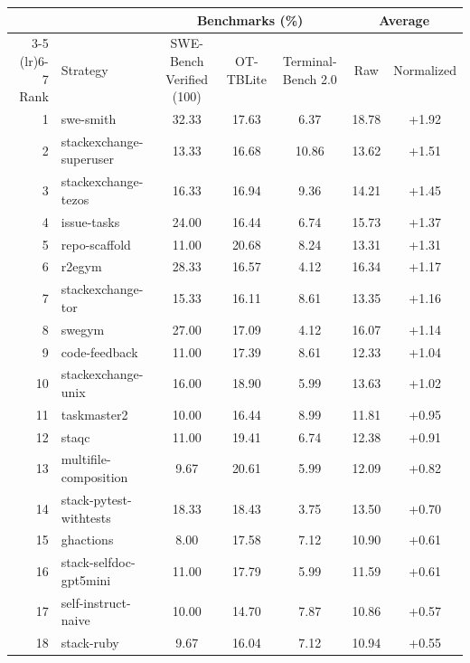 \documentclass{llmxive}
\begin{document}
\begin{table}[!htbp]
\centering
\footnotesize
\setlength{\tabcolsep}{4pt}
\begin{tabular}{rlccccc}
\toprule
 & & \multicolumn{3}{c}{Benchmarks (\%)} & \multicolumn{2}{c}{Average} \\
\cmidrule(lr){3-5} \cmidrule(lr){6-7}
Rank & Strategy & SWE-Bench Verified (100) & OT-TBLite & Terminal-Bench 2.0 & Raw & Normalized \\
\midrule
1  & swe-smith                       & 32.33 & 17.63 &  6.37 & 18.78 & +1.92 \\
2  & stackexchange-superuser        & 13.33 & 16.68 & 10.86 & 13.62 & +1.51 \\
3  & stackexchange-tezos            & 16.33 & 16.94 &  9.36 & 14.21 & +1.45 \\
4  & issue-tasks                    & 24.00 & 16.44 &  6.74 & 15.73 & +1.37 \\
5  & repo-scaffold                  & 11.00 & 20.68 &  8.24 & 13.31 & +1.31 \\
6  & r2egym                         & 28.33 & 16.57 &  4.12 & 16.34 & +1.17 \\
7  & stackexchange-tor              & 15.33 & 16.11 &  8.61 & 13.35 & +1.16 \\
8  & swegym                         & 27.00 & 17.09 &  4.12 & 16.07 & +1.14 \\
9  & code-feedback                  & 11.00 & 17.39 &  8.61 & 12.33 & +1.04 \\
10 & stackexchange-unix             & 16.00 & 18.90 &  5.99 & 13.63 & +1.02 \\
11 & taskmaster2                    & 10.00 & 16.44 &  8.99 & 11.81 & +0.95 \\
12 & staqc                          & 11.00 & 19.41 &  6.74 & 12.38 & +0.91 \\
13 & multifile-composition          &  9.67 & 20.61 &  5.99 & 12.09 & +0.82 \\
14 & stack-pytest-withtests         & 18.33 & 18.43 &  3.75 & 13.50 & +0.70 \\
15 & ghactions                      &  8.00 & 17.58 &  7.12 & 10.90 & +0.61 \\
16 & stack-selfdoc-gpt5mini         & 11.00 & 17.79 &  5.99 & 11.59 & +0.61 \\
17 & self-instruct-naive            & 10.00 & 14.70 &  7.87 & 10.86 & +0.57 \\
18 & stack-ruby                     &  9.67 & 16.04 &  7.12 & 10.94 & +0.55 \\

\end{tabular}
\end{table}
\end{document}
